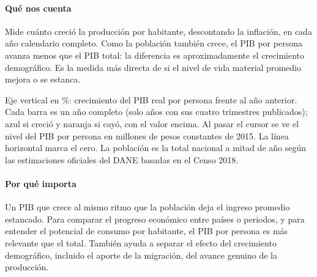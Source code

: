 \paragraph{Qué nos cuenta}
Mide cuánto creció la producción por habitante, descontando la inflación, en cada año calendario completo. Como la población también crece, el PIB por persona avanza menos que el PIB total: la diferencia es aproximadamente el crecimiento demográfico. Es la medida más directa de si el nivel de vida material promedio mejora o se estanca.

\begin{leer}
Eje vertical en \%: crecimiento del PIB real por persona frente al año anterior. Cada barra es un año completo (solo años con sus cuatro trimestres publicados); azul si creció y naranja si cayó, con el valor encima. Al pasar el cursor se ve el nivel del PIB por persona en millones de pesos constantes de 2015. La línea horizontal marca el cero. La población es la total nacional a mitad de año según las estimaciones oficiales del DANE basadas en el Censo 2018.
\end{leer}

\paragraph{Por qué importa}
Un PIB que crece al mismo ritmo que la población deja el ingreso promedio estancado. Para comparar el progreso económico entre países o periodos, y para entender el potencial de consumo por habitante, el PIB por persona es más relevante que el total. También ayuda a separar el efecto del crecimiento demográfico, incluido el aporte de la migración, del avance genuino de la producción.

